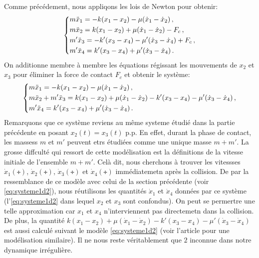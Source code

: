 \noindent Comme précédement, nous appliqons les lois de Newton pour obtenir:
\begin{align}
    \begin{dcases}
    m\ddot x_1 = -k(x_1 - x_2) - \mu (\dot x_1 - \dot x_2) \,, \\
    m\ddot x_2 = k(x_1 - x_2) + \mu (\dot x_1 - \dot x_2) - F_c \,, \\
    m'\ddot x_3 = - k'(x_3 - x_4) - \mu'(\dot x_3 - \dot x_4) + F_c \,, \\
        m' \ddot x_4 =  k'(x_3 - x_4) + \mu'(\dot x_3 - \dot x_4) \,. 
    \end{dcases}
\end{align}
On additionne membre à membre les équations régissant les mouvements de $x_2$ et $x_3$ pour éliminer la force de contact $F_c$ et obtenir le système:
\begin{align}\label{eq:systeme3test}
    \begin{dcases}
    m\ddot x_1 = -k(x_1 - x_2) - \mu (\dot x_1 - \dot x_2) \,, \\
    m\ddot x_2 + m'\ddot x_3 = k(x_1 - x_2) + \mu (\dot x_1 - \dot x_2) - k'(x_3 - x_4) - \mu'(\dot x_3 - \dot x_4) \,, \\
        m' \ddot x_4 =  k'(x_3 - x_4) + \mu'(\dot x_3 - \dot x_4) \,. 
    \end{dcases}
\end{align}
Remarquons que ce système reviens au même systeme étudié dans la partie précédente en posant $x_2(t) = x_3(t) $ p.p. En effet, durant la phase de contact, les massess $m$ et $m'$ peuvent etrs étudiées comme une unique masse $m+m'$. La grosse diffculté qui ressort de cette modélisation est la définitions de la vitesse initiale de l'ensemble $m+m'$. Celà dit, nous cherchons à trouver les vitessses $\dot x_1(\tplus)$, $\dot x_2(\tplus)$, $\dot x_3(\tplus)$ et $\dot x_4(\tplus)$ immédiatemetn après la collision. De par la ressemblance de ce modèle avec celui de la section précédente (voir \cref{eq:systeme1d2}), nous réutilisons les quantités $\dot x_1$ et $\dot x_4$ données par ce système (l'\cref{eq:systeme1d2} dans lequel $x_2$ et $x_3$ sont confondus). On peut se permertre une telle approximation car $x_1$ et $x_4$ n'interviennent pas directemetn dans la collision. De plus, la quantité $k(x_1 - x_2) + \mu (\dot x_1 - \dot x_2) - k'(x_3 - x_4) - \mu'(\dot x_3 - \dot x_4)$
est aussi calculé suivant le modèle \cref{eq:systeme1d2} (voir l'article \parencite{tommasino2020effect} pour une modélisation similaire). Il ne nous reste véritablement que $2$ inconnue dans notre dynamique irrégulière.

